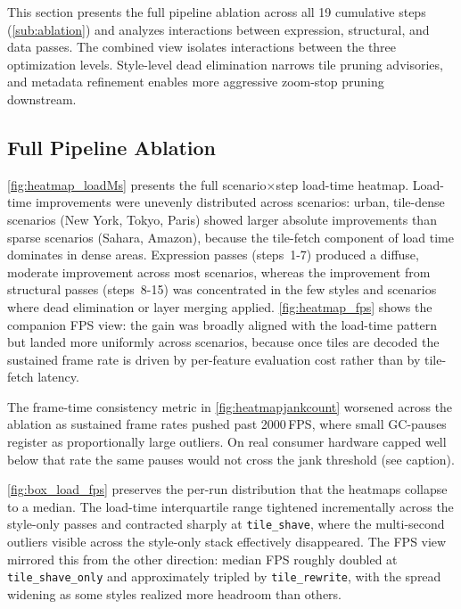 \noindent This section presents the full pipeline ablation across all 19 cumulative steps (\cref{sub:ablation}) and analyzes interactions between expression, structural, and data passes.
The combined view isolates interactions between the three optimization levels.
Style-level dead elimination narrows tile pruning advisories, and metadata refinement enables more aggressive zoom-stop pruning downstream.

\subsection{Full Pipeline Ablation}\label{sub:combined_ablation}

\cref{fig:heatmap_loadMs} presents the full scenario$\times$step load-time heatmap.
Load-time improvements were unevenly distributed across scenarios: urban, tile-dense scenarios (New York, Tokyo, Paris) showed larger absolute improvements than sparse scenarios (Sahara, Amazon), because the tile-fetch component of load time dominates in dense areas.
Expression passes (steps~1-7) produced a diffuse, moderate improvement across most scenarios, whereas the improvement from structural passes (steps~8-15) was concentrated in the few styles and scenarios where dead elimination or layer merging applied.
\cref{fig:heatmap_fps} shows the companion \ac{FPS} view: the gain was broadly aligned with the load-time pattern but landed more uniformly across scenarios, because once tiles are decoded the sustained frame rate is driven by per-feature evaluation cost rather than by tile-fetch latency.

The frame-time consistency metric in \cref{fig:heatmapjankcount} worsened across the ablation as sustained frame rates pushed past 2000\,\ac{FPS}, where small \ac{GC}-pauses register as proportionally large outliers.
On real consumer hardware capped well below that rate the same pauses would not cross the jank threshold (see caption).

\cref{fig:box_load_fps} preserves the per-run distribution that the heatmaps collapse to a median.
The load-time interquartile range tightened incrementally across the style-only passes and contracted sharply at \texttt{tile\_shave}, where the multi-second outliers visible across the style-only stack effectively disappeared.
The \ac{FPS} view mirrored this from the other direction: median \ac{FPS} roughly doubled at \texttt{tile\_shave\_only} and approximately tripled by \texttt{tile\_rewrite}, with the spread widening as some styles realized more headroom than others.

